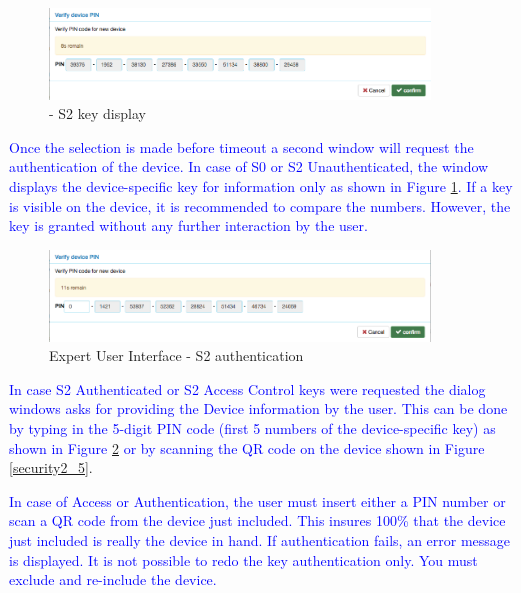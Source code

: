\begin{figure}
\begin{center}
\includegraphics[width=0.9\textwidth]{pngs/cap7/security2_3.png}
\caption{\zweui - S2 key display}
\label{security2_3}
\end{center}
\end{figure}


\textcolor{blue}{Once the selection is made before timeout a second window  will request 
the authentication of the device. In case of S0 or S2 Unauthenticated, the window 
displays the device-specific key for information only as shown in Figure \ref{security2_3}. 
If a key is visible on the device, it is recommended to compare the numbers. However, 
the key is granted without any further interaction by the user.}

\begin{figure}
\begin{center}
\includegraphics[width=0.9\textwidth]{pngs/cap7/security2_4.png}
\caption{Expert User Interface - S2 authentication}
\label{security2_4}
\end{center}
\end{figure}


\textcolor{blue}{In case S2 Authenticated or S2 Access Control keys were requested the 
dialog windows asks for providing the Device information by the user. This can be done 
by typing in the 5-digit PIN code (first 5 numbers of the device-specific key) as shown
in Figure} \ref{security2_4} \textcolor{blue}{or by 
scanning the QR code on the device shown in Figure} \ref{security2_5}.

\textcolor{blue}{In case of Access or Authentication, the user must insert either a PIN 
number or scan a QR code from the device just included. This insures 100\% that the device 
just included is really the device in hand.
If authentication fails, an error message is displayed. It is not possible to redo 
the key authentication only. You must exclude and re-include the device.}


